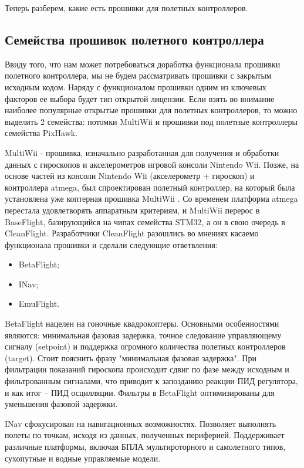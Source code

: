 Теперь разберем, какие есть прошивки для полетных контроллеров.

\subsection{Семейства прошивок полетного контроллера}
Ввиду того, что нам может потребоваться доработка функционала прошивки полетного контроллера, мы не будем рассматривать прошивки с закрытым исходным кодом. Наряду с функционалом прошивки одним из ключевых факторов ее выбора будет тип открытой лицензии. Если взять во внимание наиболее популярные открытые прошивки для полетных контроллеров, то можно выделить 2 семейства: потомки MultiWii и прошивки под полетные контроллеры семейства PixHawk.

MultiWii - прошивка, изначально разработанная для получения и обработки данных с гироскопов и акселерометров игровой консоли Nintendo Wii. Позже, на основе частей из консоли Nintendo Wii (акселерометр + гироскоп) и контроллера atmega, был спроектирован полетный контроллер, на который была установлена уже коптерная прошивка MultiWii \cite{multiwii}. Со временем платформа atmega перестала удовлетворять аппаратным критериям, и MultiWii перерос в BaseFlight, базирующийся на чипах семейства STM32, а он в свою очередь в CleanFlight. Разработчики CleanFlight разошлись во мнениях касаемо функционала прошивки и сделали следующие ответвления:
\begin{itemize}
	\item BetaFlight;
	\item INav;
	\item EmuFlight.
\end{itemize}

BetaFlight нацелен на гоночные квадрокоптеры. Основными особенностями являются: минимальная фазовая задержка, точное следование управляющему сигналу (setpoint) и поддержка огромного количества полетных контроллеров (target).
Стоит пояснить фразу "минимальная фазовая задержка". При фильтрации показаний гироскопа происходит сдвиг по фазе между исходным и фильтрованным сигналами, что приводит к запозданию реакции ПИД регулятора, и как итог -- ПИД осцилляции. Фильтры в BetaFlight оптимизированы для уменьшения фазовой задержки.

INav сфокусирован на навигационных возможностях. Позволяет выполнять полеты по точкам, исходя из данных, полученных периферией. Поддерживает различные платформы, включая БПЛА мультироторного и самолетного типов, сухопутные и водные управляемые модели.

